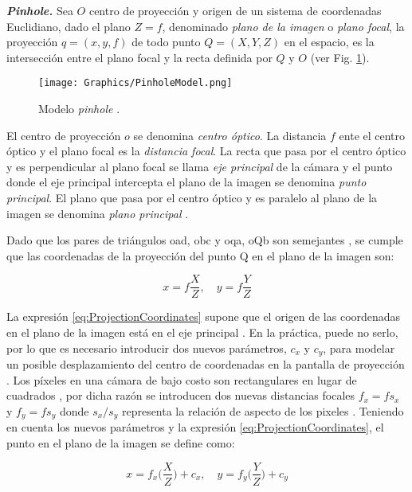 \textit{\textbf{Pinhole.}} Sea $O$ centro de proyección y origen de un sistema de coordenadas Euclidiano, dado el plano $Z = f$, denominado \textit{plano de la imagen} o \textit{plano focal}, la proyección $q = (x,y,f)$ de todo punto $Q = (X,Y,Z)$ en el espacio, es la intersección entre el plano focal y la recta definida por $Q$ y $O$ (ver Fig. \ref{fig:PinholeModel}).

\begin{figure}[h!]
    \centering
    \texttt{[image: Graphics/PinholeModel.png]}
    \caption{Modelo \textit{pinhole} \cite{DVD}.}
    \label{fig:PinholeModel}
\end{figure}

El centro de proyección $o$ se denomina \textit{centro óptico}. La distancia $f$ ente el centro óptico y el plano focal es la \textit{distancia focal}. La recta que pasa por el centro óptico y es perpendicular al plano focal se llama \textit{eje principal} de la cámara y el punto donde el eje principal intercepta el plano de la imagen se denomina \textit{punto principal}. El plano que pasa por el centro óptico y es paralelo al plano de la imagen se denomina \textit{plano principal} \cite{DVD}.

Dado que los pares de triángulos oad, obc y oqa, oQb son semejantes \cite{DVD}, se cumple que las
coordenadas de la proyección del punto Q en el plano de la imagen son:

\begin{equation}
    x=f\frac{X}{Z}, \quad y=f\frac{Y}{Z}
    \label{eq:ProjectionCoordinates}
\end{equation}

La expresión \ref{eq:ProjectionCoordinates} supone que el origen de las coordenadas en el plano de la imagen está en el eje principal \cite{RichardAndrew}. En la práctica, puede no serlo, por lo que es necesario introducir dos nuevos parámetros, $c_x$ y $c_y$, para modelar un posible desplazamiento del centro de coordenadas en la pantalla de proyección \cite{GaryAdrian}. Los píxeles en una cámara de bajo costo son rectangulares en lugar de cuadrados \cite{GaryAdrian}, por dicha razón se introducen dos nuevas distancias focales $f_x=fs_x$ y $f_y=fs_y$ donde $s_x/s_y$ representa la relación de aspecto de los pixeles \cite{DVD}. Teniendo en cuenta los nuevos parámetros y la expresión \ref{eq:ProjectionCoordinates}, el punto en el plano de la imagen se define como:

\begin{equation}
    x=f_x\bigg(\frac{X}{Z}\bigg) + c_x, \quad y=f_y\bigg(\frac{Y}{Z}\bigg) + c_y
    \label{eq:ProjectionCoordinates2}
\end{equation}

